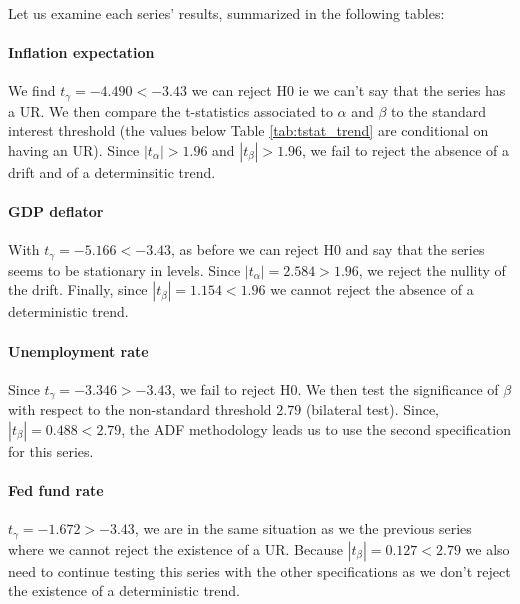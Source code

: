 \documentclass[hidelinks,12pts]{article}
\DeclareMathOperator{\1}{\mathbbm{1}}
\begin{document}
Let us examine each series' results, summarized in the following tables: 


%



\paragraph{Inflation expectation} 
We find $t_\gamma = -4.490 < -3.43$  we can reject H0 ie we can't say that the series has a UR. 
We then compare the t-statistics associated to $\alpha$ and $\beta$ to the standard interest threshold (the values below Table \ref{tab:tstat_trend} are conditional on having an UR). 
Since $|t_\alpha|> 1.96$ and $|t_\beta| > 1.96$, we fail to reject the absence of a drift and of a determinsitic trend.
    

\paragraph{GDP deflator}
With $t_\gamma = -5.166 < -3.43$, as before we can reject H0 and say that the series seems to be stationary in levels. 
Since $|t_\alpha| = 2.584 > 1.96$, we reject the nullity of the drift. 
Finally, since $|t_\beta| = 1.154 < 1.96$ we cannot reject the absence of a deterministic trend.  


\paragraph{Unemployment rate}
Since $t_\gamma = -3.346 > -3.43$, we fail to reject H0. We then test the significance of $\beta$ with respect to the non-standard threshold $2.79$ (bilateral test).
Since, $|t_\beta| = 0.488 < 2.79$, the ADF methodology leads us to use the second specification for this series. 


\paragraph{Fed fund rate}  
$t_\gamma = -1.672 > -3.43$, we are in the same situation as we the previous series where we cannot reject the existence of a UR. 
Because $|t_\beta| = 0.127 < 2.79$ we also need to continue testing this series with the other specifications as we don't reject the existence of a deterministic trend. 
\end{document}
